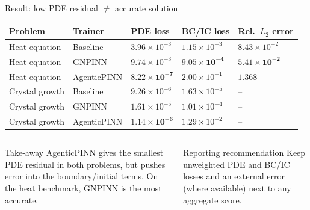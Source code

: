 \documentclass[aspectratio=169,10pt]{beamer}
\begin{document}
\begin{frame}{Result: low PDE residual $\neq$ accurate solution}
\small
\renewcommand{\arraystretch}{1.2}
\begin{tabularx}{\textwidth}{l l >{\raggedleft\arraybackslash}X >{\raggedleft\arraybackslash}X >{\raggedleft\arraybackslash}X}
\toprule
Problem & Trainer & PDE loss & BC/IC loss & Rel.\ $L_2$ error \\
\midrule
Heat equation   & Baseline    & $3.96\times10^{-3}$ & $1.15\times10^{-3}$ & $8.43\times10^{-2}$ \\
Heat equation   & GNPINN      & $9.74\times10^{-3}$ & $\mathbf{9.05\times10^{-4}}$ & $\mathbf{5.41\times10^{-2}}$ \\
Heat equation   & AgenticPINN & $\mathbf{8.22\times10^{-7}}$ & $2.00\times10^{-1}$ & $1.368$ \\
\midrule
Crystal growth  & Baseline    & $9.26\times10^{-6}$ & $1.63\times10^{-5}$ & -- \\
Crystal growth  & GNPINN      & $1.61\times10^{-5}$ & $1.01\times10^{-4}$ & -- \\
Crystal growth  & AgenticPINN & $\mathbf{1.14\times10^{-6}}$ & $1.29\times10^{-2}$ & -- \\
\bottomrule
\end{tabularx}

\vspace{0.25cm}
\begin{columns}[T,onlytextwidth]
\begin{alertblock}{Take-away}
\small AgenticPINN gives the smallest PDE residual in both problems, but pushes error into the
boundary/initial terms. On the heat benchmark, GNPINN is the most accurate.
\end{alertblock}
\begin{block}{Reporting recommendation}
\small Keep unweighted PDE and BC/IC losses and an external error (where available) next to
any aggregate score.
\end{block}
\end{columns}
\end{frame}
\end{document}

